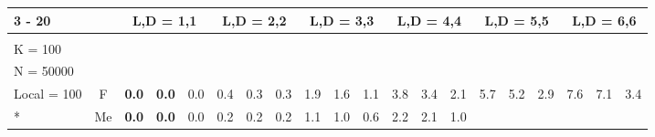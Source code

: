 \documentclass[french,10pt]{article}
\begin{document}
    \begin{landscape}




\setlength\tabcolsep{0.07cm}
\begin{longtable}{ l c | c c c | c c c | c c c | c c c | c c c | c c c | }
    \cline{3 -  20 }

        
&
& \multicolumn{3}{|c}{
    L,D = 1,1 }     & \multicolumn{3}{|c}{
    L,D = 2,2 }     & \multicolumn{3}{|c}{
    L,D = 3,3 }     & \multicolumn{3}{|c}{
    L,D = 4,4 }     & \multicolumn{3}{|c}{
    L,D = 5,5 }     & \multicolumn{3}{|c|}{
L,D = 6,6 }  \\     

    \endfirsthead
    \endhead
    \endfoot
    \endlastfoot

    \hline
    \multirow{6}{*}{
    \makecell{ \textbf{ $(x_{i}) \mapsto (\exp(x_{i}) )$ } \\
    {\small K = 100 } \\
    {\small N = 50000 } \\ {\small Local = 100 }}
    }

                & {\small F  }

    &                     \textbf{ 0.0}
     & {\footnotesize     \textbf{ 0.0}
    } & {\footnotesize     0.0
     }


    & 0.4
     & {\footnotesize     0.3
    } & {\footnotesize     0.3
     }


    & 1.9
     & {\footnotesize     1.6
    } & {\footnotesize     1.1
     }


    & 3.8
     & {\footnotesize     3.4
    } & {\footnotesize     2.1
     }


    & 5.7
     & {\footnotesize     5.2
    } & {\footnotesize     2.9
     }


    & 7.6
     & {\footnotesize     7.1
    } & {\footnotesize     3.4
     }
    
    
                    \\*
                        & {\small Me  }

    &                     \textbf{ 0.0}
     & {\footnotesize     \textbf{ 0.0}
    } & {\footnotesize     0.0
     }


    & 0.2
     & {\footnotesize     0.2
    } & {\footnotesize     0.2
     }


    & 1.1
     & {\footnotesize     1.0
    } & {\footnotesize     0.6
     }


    & 2.2
     & {\footnotesize     2.1
    } & {\footnotesize     1.0
     }



\end{longtable}
\end{landscape}
\end{document}
